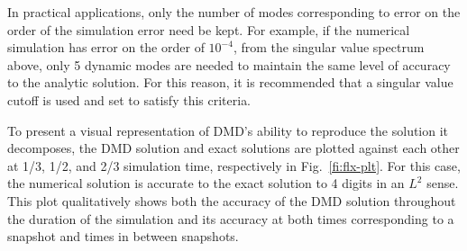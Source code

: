 \documentclass[12pt]{article}
\newcommand{\FI}[1]{Fig.~\ref{fi:#1}}
\begin{document}
In practical applications, only the number of modes corresponding to error on 
 the order of the simulation error need be kept. 
For example, if the numerical simulation has error on the order of $10^{-4}$, 
 from the singular value spectrum above, only 5 dynamic modes are needed to 
 maintain the same level of accuracy to the analytic solution. 
For this reason, it is recommended that a singular value cutoff is used and set 
 to satisfy this criteria. 

To present a visual representation of DMD's ability to reproduce the solution 
 it decomposes, the DMD solution and exact solutions are plotted against each 
 other at 1/3, 1/2, and 2/3 simulation time, respectively in \FI{flx-plt}.
For this case, the numerical solution is accurate to the exact solution to 4 
 digits in an $L^2$ sense. 
This plot qualitatively shows both the accuracy of the DMD solution throughout 
 the duration of the simulation and its accuracy at both times corresponding to 
 a snapshot and times in between snapshots.
\end{document}
